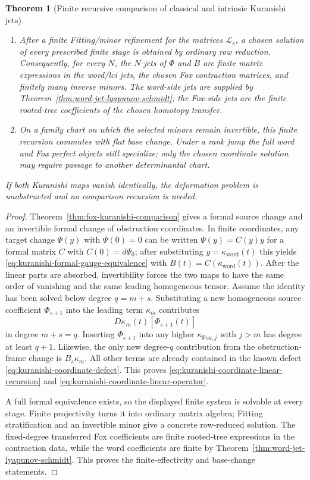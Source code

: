 \documentclass[11pt]{article}
\newtheorem{theorem}{Theorem}[section]
\theoremstyle{definition}
\begin{document}
\begin{theorem}[Finite recursive comparison of classical and intrinsic Kuranishi jets]
\begin{enumerate}[label=\textnormal{(\roman*)}]
\item After a finite Fitting/minor refinement for the matrices
$\mathcal L_s$, a chosen solution of every prescribed finite stage is obtained
by ordinary row reduction.  Consequently, for every $N$, the $N$-jets of
$\Phi$ and $B$ are finite matrix expressions in the word/lci jets, the chosen
Fox contraction matrices, and finitely many inverse minors.  The word-side
jets are supplied by Theorem~\ref{thm:word-jet-lyapunov-schmidt}; the
Fox-side jets are the finite rooted-tree coefficients of the chosen
homotopy transfer.

\item On a family chart on which the selected minors remain invertible, this
finite recursion commutes with flat base change.  Under a rank jump the full
word and Fox perfect objects still specialize; only the chosen coordinate
solution may require passage to another determinantal chart.
\end{enumerate}
If both Kuranishi maps vanish identically, the deformation problem is
unobstructed and no comparison recursion is needed.
\end{theorem}

\begin{proof}
Theorem~\ref{thm:fox-kuranishi-comparison} gives a formal source change and
an invertible formal change of obstruction coordinates.  In finite
coordinates, any target change $\Psi(y)$ with $\Psi(0)=0$ can be written
$\Psi(y)=C(y)y$ for a formal matrix $C$ with $C(0)=d\Psi_0$; after substituting
$y=\kappa_{\mathrm{word}}(t)$ this yields
\eqref{eq:kuranishi-formal-gauge-equivalence} with
$B(t)=C(\kappa_{\mathrm{word}}(t))$.  After the linear parts are absorbed,
invertibility forces the two maps to have the same order of vanishing and the
same leading homogeneous tensor.  Assume the identity has been solved below
degree $q=m+s$.  Substituting a new homogeneous
source coefficient $\Phi_{s+1}$ into the leading term $\kappa_m$ contributes
\[
 D\kappa_m(t)[\Phi_{s+1}(t)]
\]
in degree $m+s=q$.  Inserting $\Phi_{s+1}$ into any higher
$\kappa_{\mathrm{Fox},j}$ with $j>m$ has degree at least $q+1$.  Likewise, the
only new degree-$q$ contribution from the obstruction-frame change is
$B_s\kappa_m$.  All other terms are already contained in the known defect
\eqref{eq:kuranishi-coordinate-defect}.  This proves
\eqref{eq:kuranishi-coordinate-linear-recursion} and
\eqref{eq:kuranishi-coordinate-linear-operator}.

A full formal equivalence exists, so the displayed finite system is solvable
at every stage.  Finite projectivity turns it into ordinary matrix algebra;
Fitting stratification and an invertible minor give a concrete row-reduced
solution.  The fixed-degree transferred Fox coefficients are finite
rooted-tree expressions in the contraction data, while the word coefficients
are finite by Theorem~\ref{thm:word-jet-lyapunov-schmidt}.  This proves the
finite-effectivity and base-change statements.
\end{proof}
\end{document}
